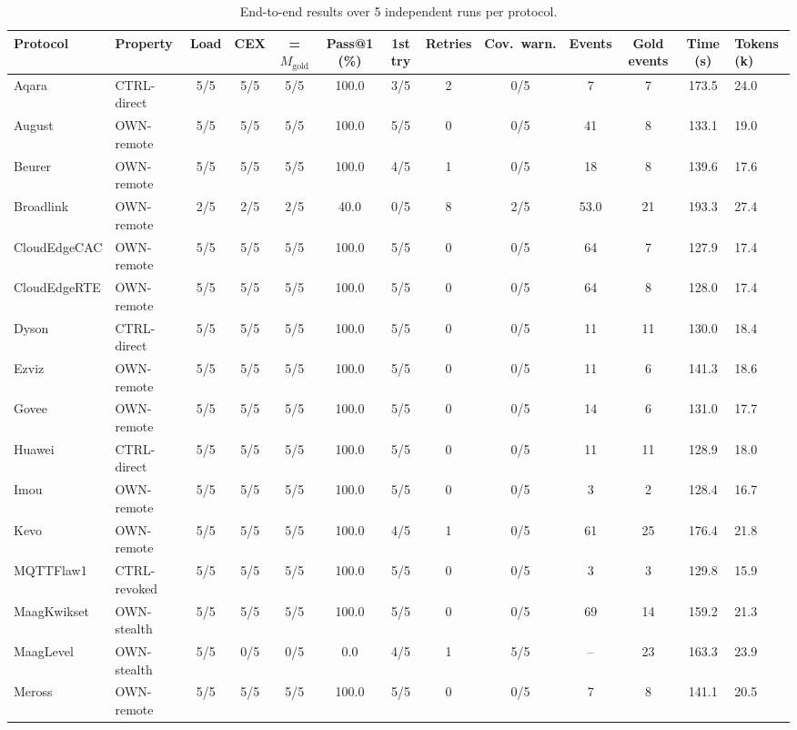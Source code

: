 \begin{table}[t]
\centering
\scriptsize
\caption{End-to-end results over 5 independent runs per protocol.}
\label{tab:pilot_eval_matrix}
\begin{tabular*}{\linewidth}{@{\extracolsep{\fill}} ll ccccc ccc cc @{}}
\hline\hline
\textbf{Protocol} & \textbf{Property} & \textbf{Load} & \textbf{CEX} & \textbf{= $M_{\mathrm{gold}}$} & \textbf{Pass@1 (\%)} & \textbf{1st try} & \textbf{Retries} & \textbf{Cov.\ warn.} & \textbf{Events} & \textbf{Gold events} & \textbf{Time (s)} & \textbf{Tokens (k)} \\
\hline
Aqara & CTRL-direct & 5/5 & 5/5 & 5/5 & 100.0 & 3/5 & 2 & 0/5 & 7 & 7 & 173.5 & 24.0 \\
August & OWN-remote & 5/5 & 5/5 & 5/5 & 100.0 & 5/5 & 0 & 0/5 & 41 & 8 & 133.1 & 19.0 \\
Beurer & OWN-remote & 5/5 & 5/5 & 5/5 & 100.0 & 4/5 & 1 & 0/5 & 18 & 8 & 139.6 & 17.6 \\
Broadlink & OWN-remote & 2/5 & 2/5 & 2/5 & 40.0 & 0/5 & 8 & 2/5 & 53.0 & 21 & 193.3 & 27.4 \\
CloudEdgeCAC & OWN-remote & 5/5 & 5/5 & 5/5 & 100.0 & 5/5 & 0 & 0/5 & 64 & 7 & 127.9 & 17.4 \\
CloudEdgeRTE & OWN-remote & 5/5 & 5/5 & 5/5 & 100.0 & 5/5 & 0 & 0/5 & 64 & 8 & 128.0 & 17.4 \\
Dyson & CTRL-direct & 5/5 & 5/5 & 5/5 & 100.0 & 5/5 & 0 & 0/5 & 11 & 11 & 130.0 & 18.4 \\
Ezviz & OWN-remote & 5/5 & 5/5 & 5/5 & 100.0 & 5/5 & 0 & 0/5 & 11 & 6 & 141.3 & 18.6 \\
Govee & OWN-remote & 5/5 & 5/5 & 5/5 & 100.0 & 5/5 & 0 & 0/5 & 14 & 6 & 131.0 & 17.7 \\
Huawei & CTRL-direct & 5/5 & 5/5 & 5/5 & 100.0 & 5/5 & 0 & 0/5 & 11 & 11 & 128.9 & 18.0 \\
Imou & OWN-remote & 5/5 & 5/5 & 5/5 & 100.0 & 5/5 & 0 & 0/5 & 3 & 2 & 128.4 & 16.7 \\
Kevo & OWN-remote & 5/5 & 5/5 & 5/5 & 100.0 & 4/5 & 1 & 0/5 & 61 & 25 & 176.4 & 21.8 \\
MQTTFlaw1 & CTRL-revoked & 5/5 & 5/5 & 5/5 & 100.0 & 5/5 & 0 & 0/5 & 3 & 3 & 129.8 & 15.9 \\
MaagKwikset & OWN-stealth & 5/5 & 5/5 & 5/5 & 100.0 & 5/5 & 0 & 0/5 & 69 & 14 & 159.2 & 21.3 \\
MaagLevel & OWN-stealth & 5/5 & 0/5 & 0/5 & 0.0 & 4/5 & 1 & 5/5 & -- & 23 & 163.3 & 23.9 \\
Meross & OWN-remote & 5/5 & 5/5 & 5/5 & 100.0 & 5/5 & 0 & 0/5 & 7 & 8 & 141.1 & 20.5 \\

\end{tabular*}
\end{table}
